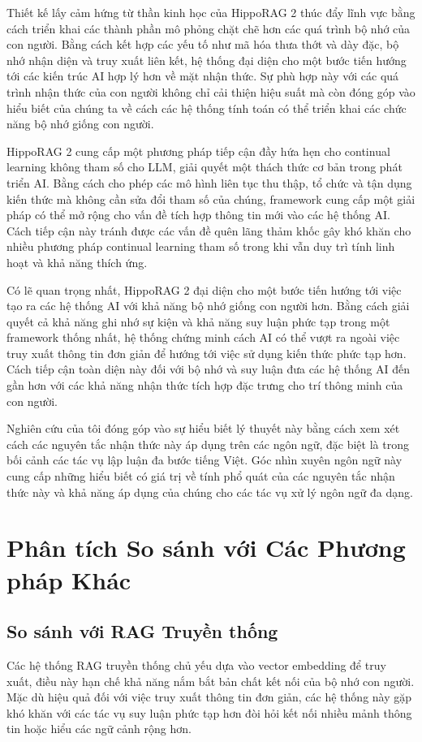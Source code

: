 \documentclass[../main.tex]{subfiles}
\begin{document}
Thiết kế lấy cảm hứng từ thần kinh học của HippoRAG 2 thúc đẩy lĩnh vực bằng cách triển khai các thành phần mô phỏng chặt chẽ hơn các quá trình bộ nhớ của con người. Bằng cách kết hợp các yếu tố như mã hóa thưa thớt và dày đặc, bộ nhớ nhận diện và truy xuất liên kết, hệ thống đại diện cho một bước tiến hướng tới các kiến trúc AI hợp lý hơn về mặt nhận thức. Sự phù hợp này với các quá trình nhận thức của con người không chỉ cải thiện hiệu suất mà còn đóng góp vào hiểu biết của chúng ta về cách các hệ thống tính toán có thể triển khai các chức năng bộ nhớ giống con người.

HippoRAG 2 cung cấp một phương pháp tiếp cận đầy hứa hẹn cho continual learning không tham số cho LLM, giải quyết một thách thức cơ bản trong phát triển AI. Bằng cách cho phép các mô hình liên tục thu thập, tổ chức và tận dụng kiến thức mà không cần sửa đổi tham số của chúng, framework cung cấp một giải pháp có thể mở rộng cho vấn đề tích hợp thông tin mới vào các hệ thống AI. Cách tiếp cận này tránh được các vấn đề quên lãng thảm khốc gây khó khăn cho nhiều phương pháp continual learning tham số trong khi vẫn duy trì tính linh hoạt và khả năng thích ứng.

Có lẽ quan trọng nhất, HippoRAG 2 đại diện cho một bước tiến hướng tới việc tạo ra các hệ thống AI với khả năng bộ nhớ giống con người hơn. Bằng cách giải quyết cả khả năng ghi nhớ sự kiện và khả năng suy luận phức tạp trong một framework thống nhất, hệ thống chứng minh cách AI có thể vượt ra ngoài việc truy xuất thông tin đơn giản để hướng tới việc sử dụng kiến thức phức tạp hơn. Cách tiếp cận toàn diện này đối với bộ nhớ và suy luận đưa các hệ thống AI đến gần hơn với các khả năng nhận thức tích hợp đặc trưng cho trí thông minh của con người.

Nghiên cứu của tôi đóng góp vào sự hiểu biết lý thuyết này bằng cách xem xét cách các nguyên tắc nhận thức này áp dụng trên các ngôn ngữ, đặc biệt là trong bối cảnh các tác vụ lập luận đa bước tiếng Việt. Góc nhìn xuyên ngôn ngữ này cung cấp những hiểu biết có giá trị về tính phổ quát của các nguyên tắc nhận thức này và khả năng áp dụng của chúng cho các tác vụ xử lý ngôn ngữ đa dạng.

\section{Phân tích So sánh với Các Phương pháp Khác}
\subsection{So sánh với RAG Truyền thống}
Các hệ thống RAG truyền thống chủ yếu dựa vào vector embedding để truy xuất, điều này hạn chế khả năng nắm bắt bản chất kết nối của bộ nhớ con người. Mặc dù hiệu quả đối với việc truy xuất thông tin đơn giản, các hệ thống này gặp khó khăn với các tác vụ suy luận phức tạp hơn đòi hỏi kết nối nhiều mảnh thông tin hoặc hiểu các ngữ cảnh rộng hơn.
\end{document}
